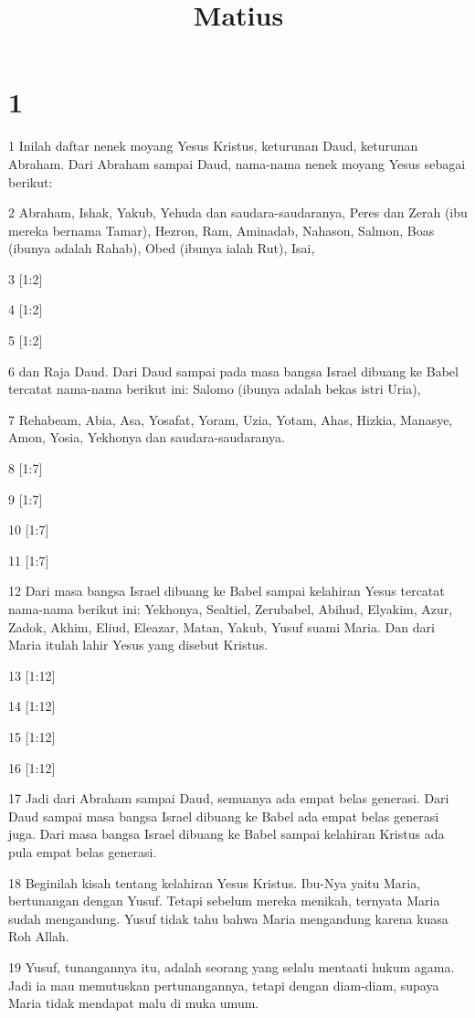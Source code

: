 

\title{Matius}


\chapter{1}

\par 1 Inilah daftar nenek moyang Yesus Kristus, keturunan Daud, keturunan Abraham. Dari Abraham sampai Daud, nama-nama nenek moyang Yesus sebagai berikut:
\par 2 Abraham, Ishak, Yakub, Yehuda dan saudara-saudaranya, Peres dan Zerah (ibu mereka bernama Tamar), Hezron, Ram, Aminadab, Nahason, Salmon, Boas (ibunya adalah Rahab), Obed (ibunya ialah Rut), Isai,
\par 3 [1:2]
\par 4 [1:2]
\par 5 [1:2]
\par 6 dan Raja Daud. Dari Daud sampai pada masa bangsa Israel dibuang ke Babel tercatat nama-nama berikut ini: Salomo (ibunya adalah bekas istri Uria),
\par 7 Rehabeam, Abia, Asa, Yosafat, Yoram, Uzia, Yotam, Ahas, Hizkia, Manasye, Amon, Yosia, Yekhonya dan saudara-saudaranya.
\par 8 [1:7]
\par 9 [1:7]
\par 10 [1:7]
\par 11 [1:7]
\par 12 Dari masa bangsa Israel dibuang ke Babel sampai kelahiran Yesus tercatat nama-nama berikut ini: Yekhonya, Sealtiel, Zerubabel, Abihud, Elyakim, Azur, Zadok, Akhim, Eliud, Eleazar, Matan, Yakub, Yusuf suami Maria. Dan dari Maria itulah lahir Yesus yang disebut Kristus.
\par 13 [1:12]
\par 14 [1:12]
\par 15 [1:12]
\par 16 [1:12]
\par 17 Jadi dari Abraham sampai Daud, semuanya ada empat belas generasi. Dari Daud sampai masa bangsa Israel dibuang ke Babel ada empat belas generasi juga. Dari masa bangsa Israel dibuang ke Babel sampai kelahiran Kristus ada pula empat belas generasi.
\par 18 Beginilah kisah tentang kelahiran Yesus Kristus. Ibu-Nya yaitu Maria, bertunangan dengan Yusuf. Tetapi sebelum mereka menikah, ternyata Maria sudah mengandung. Yusuf tidak tahu bahwa Maria mengandung karena kuasa Roh Allah.
\par 19 Yusuf, tunangannya itu, adalah seorang yang selalu mentaati hukum agama. Jadi ia mau memutuskan pertunangannya, tetapi dengan diam-diam, supaya Maria tidak mendapat malu di muka umum.
